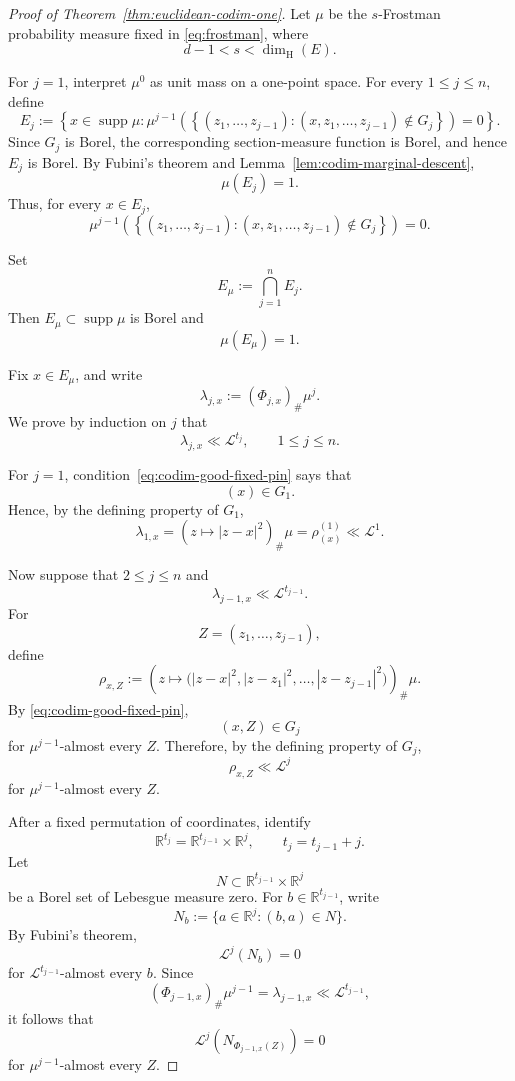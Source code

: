 \documentclass[10pt,a4paper]{amsart}
\newcommand{\R}{\mathbb R}
\newcommand{\cL}{\mathcal L}
\newcommand{\supp}{\operatorname{supp}}
\begin{document}
\begin{proof}[Proof of Theorem~\ref{thm:euclidean-codim-one}]
Let \(\mu\) be the \(s\)-Frostman probability measure fixed in
\eqref{eq:frostman}, where
\[
d-1<s<\dim_{\mathrm H}(E).
\]

For \(j=1\), interpret \(\mu^0\) as unit mass on a one-point space.
For every \(1\leq j\leq n\), define
\[
E_j
:=
\left\{
x\in\supp\mu:
\mu^{j-1}
\left(
\left\{
(z_1,\ldots,z_{j-1}):
(x,z_1,\ldots,z_{j-1})\notin G_j
\right\}
\right)
=0
\right\}.
\]
Since \(G_j\) is Borel, the corresponding section-measure function is
Borel, and hence \(E_j\) is Borel. By Fubini's theorem and
Lemma~\ref{lem:codim-marginal-descent},
\[
\mu(E_j)=1.
\]
Thus, for every \(x\in E_j\),
\begin{equation}
\mu^{j-1}
\left(
\left\{
(z_1,\ldots,z_{j-1}):
(x,z_1,\ldots,z_{j-1})\notin G_j
\right\}
\right)
=0.
\label{eq:codim-good-fixed-pin}
\end{equation}

Set
\[
E_\mu
:=
\bigcap_{j=1}^n E_j.
\]
Then \(E_\mu\subset\supp\mu\) is Borel and
\[
\mu(E_\mu)=1.
\]

Fix \(x\in E_\mu\), and write
\[
\lambda_{j,x}
:=
(\Phi_{j,x})_\#\mu^j.
\]
We prove by induction on \(j\) that
\[
\lambda_{j,x}\ll\cL^{t_j},
\qquad 1\leq j\leq n.
\]

For \(j=1\), condition~\eqref{eq:codim-good-fixed-pin} says that
\[
(x)\in G_1.
\]
Hence, by the defining property of \(G_1\),
\[
\lambda_{1,x}
=
\left(
z\longmapsto |z-x|^2
\right)_\#\mu
=
\rho^{(1)}_{(x)}
\ll\cL^1.
\]

Now suppose that \(2\leq j\leq n\) and
\[
\lambda_{j-1,x}\ll\cL^{t_{j-1}}.
\]
For
\[
Z=(z_1,\ldots,z_{j-1}),
\]
define
\[
\rho_{x,Z}
:=
\left(
z\longmapsto
\bigl(
|z-x|^2,
|z-z_1|^2,
\ldots,
|z-z_{j-1}|^2
\bigr)
\right)_\#\mu.
\]
By \eqref{eq:codim-good-fixed-pin},
\[
(x,Z)\in G_j
\]
for \(\mu^{j-1}\)-almost every \(Z\). Therefore, by the defining
property of \(G_j\),
\[
\rho_{x,Z}\ll\cL^j
\]
for \(\mu^{j-1}\)-almost every \(Z\).

After a fixed permutation of coordinates, identify
\[
\R^{t_j}
=
\R^{t_{j-1}}\times\R^j,
\qquad
t_j=t_{j-1}+j.
\]
Let
\[
N\subset\R^{t_{j-1}}\times\R^j
\]
be a Borel set of Lebesgue measure zero. For
\(b\in\R^{t_{j-1}}\), write
\[
N_b
:=
\{a\in\R^j:(b,a)\in N\}.
\]
By Fubini's theorem,
\[
\cL^j(N_b)=0
\]
for \(\cL^{t_{j-1}}\)-almost every \(b\). Since
\[
(\Phi_{j-1,x})_\#\mu^{j-1}
=
\lambda_{j-1,x}
\ll\cL^{t_{j-1}},
\]
it follows that
\[
\cL^j
\left(
N_{\Phi_{j-1,x}(Z)}
\right)
=0
\]
for \(\mu^{j-1}\)-almost every \(Z\).


\end{proof}
\end{document}
